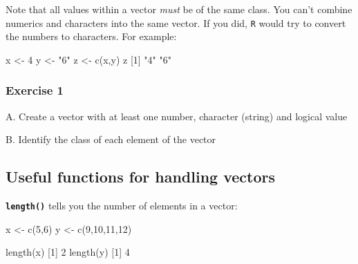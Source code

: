 \documentclass[
]{book}
\newenvironment{Shaded}{\begin{snugshade}}{\end{snugshade}}
\newcommand{\DecValTok}[1]{\textcolor[rgb]{0.00,0.00,0.81}{#1}}
\newcommand{\FunctionTok}[1]{\textcolor[rgb]{0.00,0.00,0.00}{#1}}
\newcommand{\NormalTok}[1]{#1}
\newcommand{\OtherTok}[1]{\textcolor[rgb]{0.56,0.35,0.01}{#1}}
\newcommand{\StringTok}[1]{\textcolor[rgb]{0.31,0.60,0.02}{#1}}
\begin{document}
Note that all values within a vector \emph{must} be of the same class. You can't combine numerics and characters into the same vector. If you did, \texttt{R} would try to convert the numbers to characters. For example:

\begin{Shaded}
\begin{Highlighting}[]
\NormalTok{x }\OtherTok{\textless{}{-}} \DecValTok{4}
\NormalTok{y }\OtherTok{\textless{}{-}} \StringTok{"6"}
\NormalTok{z }\OtherTok{\textless{}{-}} \FunctionTok{c}\NormalTok{(x,y)}
\NormalTok{z}
\NormalTok{[}\DecValTok{1}\NormalTok{] }\StringTok{"4"} \StringTok{"6"}
\end{Highlighting}
\end{Shaded}

\hypertarget{exercise-1-3}{%
\subsubsection*{Exercise 1}\label{exercise-1-3}}

A. Create a vector with at least one number, character (string) and logical value

B. Identify the class of each element of the vector

\hypertarget{useful-functions-for-handling-vectors}{%
\subsection*{Useful functions for handling vectors}\label{useful-functions-for-handling-vectors}}

\textbf{\texttt{length()}} tells you the number of elements in a vector:

\begin{Shaded}
\begin{Highlighting}[]
\NormalTok{x }\OtherTok{\textless{}{-}} \FunctionTok{c}\NormalTok{(}\DecValTok{5}\NormalTok{,}\DecValTok{6}\NormalTok{)}
\NormalTok{y }\OtherTok{\textless{}{-}} \FunctionTok{c}\NormalTok{(}\DecValTok{9}\NormalTok{,}\DecValTok{10}\NormalTok{,}\DecValTok{11}\NormalTok{,}\DecValTok{12}\NormalTok{)}

\FunctionTok{length}\NormalTok{(x)}
\NormalTok{[}\DecValTok{1}\NormalTok{] }\DecValTok{2}
\FunctionTok{length}\NormalTok{(y)}
\NormalTok{[}\DecValTok{1}\NormalTok{] }\DecValTok{4}
\end{Highlighting}
\end{Shaded}
\end{document}
